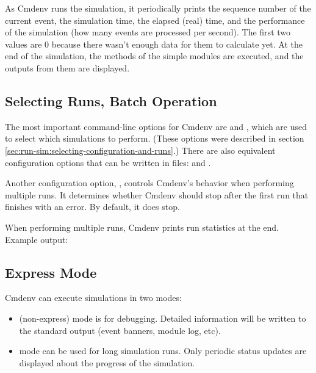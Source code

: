 As Cmdenv runs the simulation, it periodically prints the sequence number
of the current event, the simulation time, the elapsed (real) time,
and the performance of the simulation (how many events are processed per
second). The first two values are 0 because there wasn't enough data
for them to calculate yet. At the end of the simulation, the 
methods of the simple modules are executed, and the outputs from them are displayed.


\subsection{Selecting Runs, Batch Operation}
\label{sec:run-sim:cmdenv-config-options}

The most important command-line options for Cmdenv are  and
, which are used to select which simulations to perform. (These options
were described in section \ref{sec:run-sim:selecting-configuration-and-runs}.)
There are also equivalent configuration options that can be written in files:
 and .

Another configuration option, , controls
Cmdenv's behavior when performing multiple runs. It determines
whether Cmdenv should stop after the first run that finishes with an
error. By default, it does stop.

When performing multiple runs, Cmdenv prints run statistics at the end. Example
output:



\subsection{Express Mode}
\label{sec:run-sim:cmdenv:express-mode}

Cmdenv can execute simulations in two modes:

\begin{itemize}
    \item {} (non-express) mode is for debugging. Detailed information
        will be written to the standard output (event banners, module log,
        etc).
    \item {} mode can be used for long simulation runs. Only
        periodic status updates are displayed about the progress of the
        simulation.
\end{itemize}

